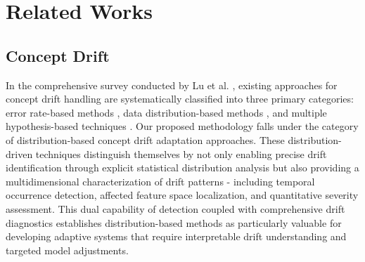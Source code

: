 \section{Related Works}
\label{appendix:relatedwork}

\subsection{Concept Drift}

In the comprehensive survey conducted by Lu et al. \cite{luLearningConceptDrift2019, lu2020data}, existing approaches for concept drift handling are systematically classified into three primary categories: error rate-based methods \cite{wangSelfadaptiveEnsembleUser2024, jiaoDynamicEnsembleSelection2024}, data distribution-based methods \cite{yang2024adaptingmultimodallargelanguage,cerqueiraSTUDDStudentTeacher2023}, and multiple hypothesis-based techniques \cite{yu2024online, yuLearnadaptConceptDrift2022}. Our proposed methodology falls under the category of distribution-based concept drift adaptation approaches. These distribution-driven techniques distinguish themselves by not only enabling precise drift identification through explicit statistical distribution analysis but also providing a multidimensional characterization of drift patterns - including temporal occurrence detection, affected feature space localization, and quantitative severity assessment. This dual capability of detection coupled with comprehensive drift diagnostics establishes distribution-based methods as particularly valuable for developing adaptive systems that require interpretable drift understanding and targeted model adjustments.


